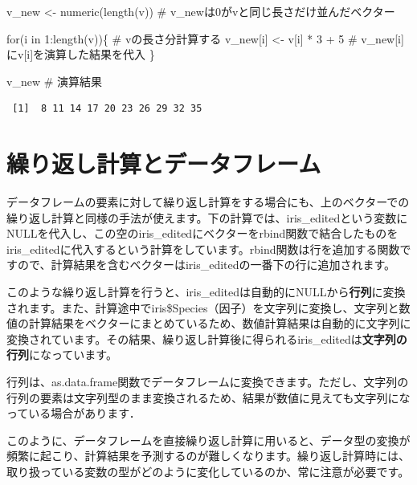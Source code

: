 \documentclass[
  letterpaper,
  DIV=11,
  numbers=noendperiod]{scrreprt}
\newenvironment{Shaded}{\begin{snugshade}}{\end{snugshade}}
\newcommand{\CommentTok}[1]{\textcolor[rgb]{0.37,0.37,0.37}{#1}}
\newcommand{\ControlFlowTok}[1]{\textcolor[rgb]{0.00,0.23,0.31}{#1}}
\newcommand{\DecValTok}[1]{\textcolor[rgb]{0.68,0.00,0.00}{#1}}
\newcommand{\FunctionTok}[1]{\textcolor[rgb]{0.28,0.35,0.67}{#1}}
\newcommand{\NormalTok}[1]{\textcolor[rgb]{0.00,0.23,0.31}{#1}}
\newcommand{\OtherTok}[1]{\textcolor[rgb]{0.00,0.23,0.31}{#1}}
\newcommand{\SpecialCharTok}[1]{\textcolor[rgb]{0.37,0.37,0.37}{#1}}
\begin{document}
\begin{Shaded}
\begin{Highlighting}[]
\NormalTok{v\_new }\OtherTok{\textless{}{-}} \FunctionTok{numeric}\NormalTok{(}\FunctionTok{length}\NormalTok{(v)) }\CommentTok{\# v\_newは0がvと同じ長さだけ並んだベクター}

\ControlFlowTok{for}\NormalTok{(i }\ControlFlowTok{in} \DecValTok{1}\SpecialCharTok{:}\FunctionTok{length}\NormalTok{(v))\{ }\CommentTok{\# vの長さ分計算する}
\NormalTok{  v\_new[i] }\OtherTok{\textless{}{-}}\NormalTok{ v[i] }\SpecialCharTok{*} \DecValTok{3} \SpecialCharTok{+} \DecValTok{5} \CommentTok{\# v\_new[i]にv[i]を演算した結果を代入}
\NormalTok{\}}

\NormalTok{v\_new }\CommentTok{\# 演算結果}
\end{Highlighting}
\end{Shaded}

\begin{verbatim}
 [1]  8 11 14 17 20 23 26 29 32 35
\end{verbatim}

\hypertarget{ux7e70ux308aux8fd4ux3057ux8a08ux7b97ux3068ux30c7ux30fcux30bfux30d5ux30ecux30fcux30e0}{%
\section{繰り返し計算とデータフレーム}\label{ux7e70ux308aux8fd4ux3057ux8a08ux7b97ux3068ux30c7ux30fcux30bfux30d5ux30ecux30fcux30e0}}

データフレームの要素に対して繰り返し計算をする場合にも、上のベクターでの繰り返し計算と同様の手法が使えます。下の計算では、iris\_editedという変数にNULLを代入し、この空のiris\_editedにベクターをrbind関数で結合したものをiris\_editedに代入するという計算をしています。rbind関数は行を追加する関数ですので、計算結果を含むベクターはiris\_editedの一番下の行に追加されます。

このような繰り返し計算を行うと、iris\_editedは自動的にNULLから\textbf{行列}に変換されます。また、計算途中でiris\$Species（因子）を文字列に変換し、文字列と数値の計算結果をベクターにまとめているため、数値計算結果は自動的に文字列に変換されています。その結果、繰り返し計算後に得られるiris\_editedは\textbf{文字列の行列}になっています。

行列は、as.data.frame関数でデータフレームに変換できます。ただし、文字列の行列の要素は文字列型のまま変換されるため、結果が数値に見えても文字列になっている場合があります．

このように、データフレームを直接繰り返し計算に用いると、データ型の変換が頻繁に起こり、計算結果を予測するのが難しくなります。繰り返し計算時には、取り扱っている変数の型がどのように変化しているのか、常に注意が必要です。
\end{document}
